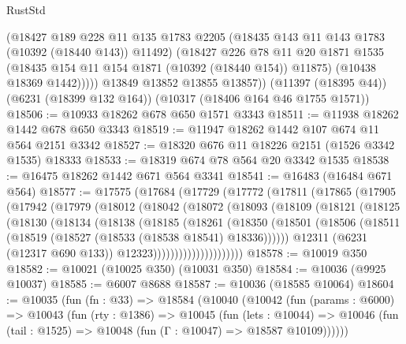 \begin{lexlean}{RustStd}
\begin{coremodule}
{{            (@18427
              @189
              @228
              @11
              @135
              @1783
              @2205
              (@18435 @143 @11 @143 @1783 (@10392 (@18440 @143)) @11492)
              (@18427
                @226
                @78
                @11
                @20
                @1871
                @1535
                (@18435 @154 @11 @154 @1871 (@10392 (@18440 @154)) @11875)
                (@10438 @18369 @1442)))))
        @13849
        @13852
        @13855
        @13857))
    (@11397 (@18395 @44))
    (@6231 (@18399 @132 @164))
    (@10317 (@18406 @164 @46 @1755 @1571))
@18506 := @10933 @18262 @678 @650 @1571 @3343
@18511 := @11938 @18262 @1442 @678 @650 @3343
@18519 := @11947 @18262 @1442 @107 @674 @11 @564 @2151 @3342
@18527 := @18320 @676 @11 @18226 @2151 (@1526 @3342 @1535) @18333
@18533 := @18319 @674 @78 @564 @20 @3342 @1535
@18538 := @16475 @18262 @1442 @671 @564 @3341
@18541 := @16483 (@16484 @671 @564)
@18577 := @17575
    (@17684
      (@17729
        (@17772
          (@17811
            (@17865
              (@17905
                (@17942
                  (@17979
                    (@18012
                      (@18042
                        (@18072
                          (@18093
                            (@18109
                              (@18121
                                (@18125
                                  (@18130
                                    (@18134
                                      (@18138
                                        (@18185
                                          (@18261
                                            (@18350
                                              (@18501
                                                (@18506
                                                  (@18511
                                                    (@18519
                                                      (@18527 (@18533 (@18538 @18541) @18336))))))
                                              @12311
                                              (@6231 (@12317 @690 @133))
                                              @12323)))))))))))))))))))))
@18578 := @10019 @350
@18582 := @10021 (@10025 @350) (@10031 @350)
@18584 := @10036 (@9925 @10037)
@18585 := @6007 @8688
@18587 := @10036 (@18585 @10064)
@18604 := @10035
    (fun (fn : @33) =>
    @18584
      (@10040
        (@10042
          (fun (params : @6000) =>
          @10043
            (fun (rty : @1386) =>
            @10045
              (fun (lets : @10044) =>
              @10046 (fun (tail : @1525) => @10048 (fun (Γ : @10047) => @18587 @10109))))))
}}
\end{coremodule}
\end{lexlean}
